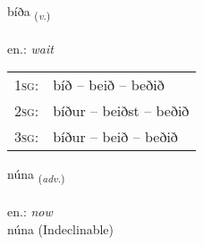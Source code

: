 \documentclass[frontgrid, backgrid]{flacards}\usepackage[]{graphicx}\usepackage[]{xcolor}
\begin{document}
\renewcommand{\flhead}{\vskip5pt \fboxsep=0pt {\small\bfseries\footnotesize Sagnorð | Verb}}
\renewcommand{\fcfoot}{\vskip5pt \fboxsep=0pt \hspace{2pt}{\small\bfseries\footnotesize 1K}}

\renewcommand{\blhead}{\vskip5pt {\small\bfseries\footnotesize Sagnorð | Verb }}
\renewcommand{\bcfoot}{\vskip5pt \hspace{2pt}{\small\bfseries\footnotesize 1K}}


{bíða \small{\textsubscript{(\textit{v.})}} \\[1ex] %
\textphonetic{[piːða]} \\
en.: \emph{wait} \\  [2ex]
\renewcommand*{\arraystretch}{0.8}
\begin{tabular}{p{1cm}l}
\textsc{1sg}: & bíð -- beið -- beðið \\ 
\textsc{2sg}: & bíður -- beiðst -- beðið \\ 
\textsc{3sg}: & bíður -- beið -- beðið \\ 
\end{tabular}
}


\renewcommand{\flhead}{\vskip5pt \fboxsep=0pt {\small\bfseries\footnotesize Atviksorð | Adverb}}
\renewcommand{\fcfoot}{\vskip5pt \fboxsep=0pt \hspace{2pt}{\small\bfseries\footnotesize 1K}}

\renewcommand{\blhead}{\vskip5pt {\small\bfseries\footnotesize Atviksorð | Adverb }}
\renewcommand{\bcfoot}{\vskip5pt \hspace{2pt}{\small\bfseries\footnotesize 1K}}


{núna \small{\textsubscript{(\textit{adv.})}} \\[1ex]
\textphonetic{[nuːna]} \\
en.: \emph{now} \\  [2ex]
núna (Indeclinable)}

\renewcommand{\flhead}{\vskip5pt \fboxsep=0pt {\small\bfseries\footnotesize Sagnorð | Verb}}
\renewcommand{\fcfoot}{\vskip5pt \fboxsep=0pt \hspace{2pt}{\small\bfseries\footnotesize 1K}}
\end{document}
